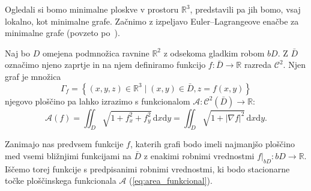 \documentclass[fin1, tisk, bibtex]{fmfdelo}
\begin{document}
Ogledali si bomo minimalne ploskve v prostoru $\mathbb{R}^3$, predstavili pa jih bomo, vsaj lokalno, kot minimalne grafe. Začnimo z izpeljavo Euler--Lagrangeove enačbe za minimalne grafe (povzeto po~\cite[Razdelek 3.1]{Vrhovnik_2022}). 

Naj bo $D$ omejena podmnožica ravnine $\mathbb{R}^2$ z odsekoma gladkim robom $bD$. Z $\bar{D}$ označimo njeno zaprtje in na njem definiramo funkcijo $f: \bar{D} \rightarrow \mathbb{R}$ razreda $\mathcal{C}^2$. Njen graf je množica
\begin{equation*}
    \Gamma_f=\left\{(x, y, z) \in \mathbb{R}^3 \mid(x, y) \in \bar{D}, z=f(x, y)\right\}
\end{equation*}
njegovo ploščino pa lahko izrazimo s funkcionalom $\mathcal{A}:\mathcal{C}^2(\bar D) \rightarrow \mathbb{R}$:
\begin{equation}
    \mathcal{A}(f)=\iint_{D} \sqrt{1+f_x^2+f_y^2} \, \mathrm{d} x \mathrm{d} y=\iint_{D} \sqrt{1+|\nabla f|^2} \, \mathrm{d} x \mathrm{d} y. \label{eq:area_funkcional}
\end{equation}

Zanimajo nas predvsem funkcije $f$, katerih grafi bodo imeli najmanjšo ploščino med vsemi bližnjimi funkcijami na $\bar{D}$ z enakimi robnimi vrednostmi $\left.f\right|_{b D}: b D \rightarrow \mathbb{R}$. Iščemo torej funkcije s predpisanimi robnimi vrednostmi, ki bodo stacionarne točke ploščinskega funkcionala $\mathcal{A}$ (\ref{eq:area_funkcional}).
\end{document}
